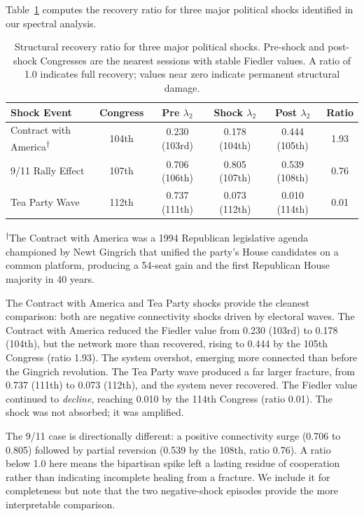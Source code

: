 \documentclass[12pt, a4paper]{article}
\begin{document}
Table~\ref{tab:resilience} computes the recovery ratio for three major political shocks identified in our spectral analysis.

\begin{table}[H]
\centering
\caption{Structural recovery ratio for three major political shocks. Pre-shock and post-shock Congresses are the nearest sessions with stable Fiedler values. A ratio of 1.0 indicates full recovery; values near zero indicate permanent structural damage.}
\label{tab:resilience}
\begin{tabular}{lccccc}
\toprule
Shock Event & Congress & Pre $\lambda_2$ & Shock $\lambda_2$ & Post $\lambda_2$ & Ratio \\
\midrule
Contract with America\textsuperscript{$\dagger$} & 104th & 0.230 (103rd) & 0.178 (104th) & 0.444 (105th) & 1.93 \\
9/11 Rally Effect & 107th & 0.706 (106th) & 0.805 (107th) & 0.539 (108th) & 0.76 \\
Tea Party Wave & 112th & 0.737 (111th) & 0.073 (112th) & 0.010 (114th) & 0.01 \\
\bottomrule
\end{tabular}
\vspace{2pt}

{\footnotesize \textsuperscript{$\dagger$}The Contract with America was a 1994 Republican legislative agenda championed by Newt Gingrich that unified the party's House candidates on a common platform, producing a 54-seat gain and the first Republican House majority in 40 years.}
\end{table}

The Contract with America and Tea Party shocks provide the cleanest comparison: both are negative connectivity shocks driven by electoral waves. The Contract with America reduced the Fiedler value from 0.230 (103rd) to 0.178 (104th), but the network more than recovered, rising to 0.444 by the 105th Congress (ratio 1.93). The system overshot, emerging more connected than before the Gingrich revolution. The Tea Party wave produced a far larger fracture, from 0.737 (111th) to 0.073 (112th), and the system never recovered. The Fiedler value continued to \textit{decline}, reaching 0.010 by the 114th Congress (ratio 0.01). The shock was not absorbed; it was amplified.

The 9/11 case is directionally different: a positive connectivity surge (0.706 to 0.805) followed by partial reversion (0.539 by the 108th, ratio 0.76). A ratio below 1.0 here means the bipartisan spike left a lasting residue of cooperation rather than indicating incomplete healing from a fracture. We include it for completeness but note that the two negative-shock episodes provide the more interpretable comparison.
\end{document}
